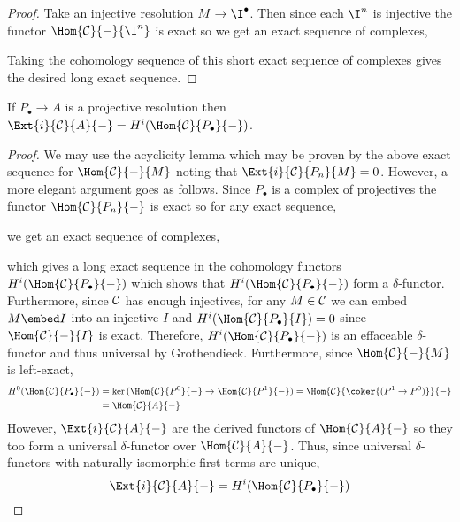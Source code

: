 \documentclass[12pt]{article}
\begin{document}
\begin{proof}
Take an injective resolution $M \to \I^\bullet$. Then since each $\I^n$ is injective the functor $\Hom{\C}{-}{\I^n}$ is exact so we get an exact sequence of complexes,
\begin{center}
\end{center}
Taking the cohomology sequence of this short exact sequence of complexes gives the desired long exact sequence. 
\end{proof}

\begin{lemma}
If $P_\bullet \to A$ is a projective resolution then $\Ext{i}{\C}{A}{-} = H^i(\Hom{\C}{P_\bullet}{-})$. 
\end{lemma}

\begin{proof}
We may use the acyclicity lemma which may be proven by the above exact sequence for $\Hom{\C}{-}{M}$ noting that $\Ext{i}{\C}{P_n}{M} = 0$. However, a more elegant argument goes as follows. Since $P_\bullet$ is a complex of projectives the functor $\Hom{\C}{P_n}{-}$ is exact so for any exact sequence,
\begin{center}
\end{center}
we get an exact sequence of complexes,
\begin{center}
\end{center}
which gives a long exact sequence in the cohomology functors $H^i(\Hom{\C}{P_\bullet}{-})$ which shows that $H^i(\Hom{\C}{P_\bullet}{-})$ form a $\delta$-functor. Furthermore, since $\mathcal{C}$ has enough injectives, for any $M \in \mathcal{C}$ we can embed $M \embed I$ into an injective $I$ and $H^i(\Hom{\C}{P_\bullet}{I}) = 0$ since $\Hom{\C}{-}{I}$ is exact. Therefore,  $H^i(\Hom{\C}{P_\bullet}{-})$ is an effaceable $\delta$-functor and thus universal by Grothendieck. Furthermore, since $\Hom{\C}{-}{M}$ is left-exact,
\begin{align*}
H^0(\Hom{\C}{P_\bullet}{-}) & = \ker{(\Hom{\C}{P^0}{-} \to \Hom{\C}{P^1}{-})} = \Hom{\C}{\coker{(P^1 \to P^0)}}{-} 
\\
& = \Hom{\C}{A}{-} 
\end{align*}
However, $\Ext{i}{\C}{A}{-}$ are the derived functors of $\Hom{\C}{A}{-}$ so they too form a universal $\delta$-functor over $\Hom{\C}{A}{-}$. Thus, since universal $\delta$-functors with naturally isomorphic first terms are unique,
\[ \Ext{i}{\C}{A}{-} = H^i(\Hom{\C}{P_\bullet}{-}) \]
\end{proof}
\end{document}
